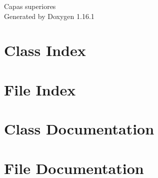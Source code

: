 \documentclass[twoside]{book}
\newcommand{\+}{\discretionary{\mbox{\scriptsize$\hookleftarrow$}}{}{}}
\newcommand{\clearemptydoublepage}{%
    \newpage{\pagestyle{empty}\cleardoublepage}%
  }
\begin{document}
  \raggedbottom
    \hypersetup{pageanchor=false,
                bookmarksnumbered=true,
                pdfencoding=unicode
               }
  \begin{titlepage}
  \vspace*{7cm}
  \begin{center}%
  {\Large Capas superiores}\\
  \vspace*{1cm}
  {\large Generated by Doxygen 1.16.1}\\
  \end{center}
  \end{titlepage}
  \clearemptydoublepage
  \tableofcontents
  \clearemptydoublepage
  \hypersetup{pageanchor=true}

\chapter{Class Index}

\chapter{File Index}

\chapter{Class Documentation}






\chapter{File Documentation}








  \backmatter
  \newpage
  \clearemptydoublepage
  \printindex
\end{document}
